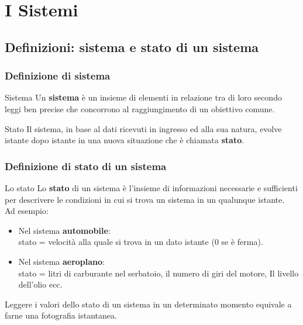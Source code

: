 \section[I Sistemi]{I Sistemi}
\label{sec:systems}

\subsection[Definizioni: sistema e stato di un sistema]{Definizioni: sistema e stato di un sistema}

\begin{frame}
	\frametitle{Definizione di sistema}
	
	\begin{block}{Sistema}
		Un \textbf{sistema} è un insieme di elementi in relazione tra di loro secondo leggi ben precise che concorrono al raggiungimento di un obiettivo comune.
	\end{block}
	\begin{block}{Stato}
		Il sistema, in base al dati ricevuti in ingresso ed alla sua natura, evolve istante dopo istante in una nuova situazione che è chiamata \textbf{stato}.
	\end{block}
\end{frame}


\begin{frame}
	\frametitle{Definizione di stato di un sistema}
	
	\begin{block}{Lo stato}
		Lo \textbf{stato} di un sistema è l'insieme di informazioni necessarie e sufficienti per descrivere le condizioni in cui si trova un sistema in un qualunque istante.\\
		\vspace{0.5em}
		Ad esempio:
		\begin{itemize}
			\item Nel sistema \textbf{automobile}:\\
				stato = velocità alla quale si trova in un dato istante (0 se è ferma).
			\item Nel sistema \textbf{aeroplano}:\\
				stato = litri di carburante nel serbatoio, il numero di giri del motore, Il livello dell’olio ecc.
		\end{itemize}
		\vspace{0.5em}
		Leggere i valori dello stato di un sistema in un determinato momento equivale a farne una fotografia istantanea.\\
		
	\end{block}
\end{frame}


